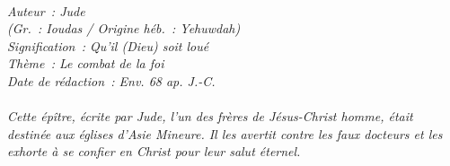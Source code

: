 \BFont
\noindent\hrulefill
{\footnotesize
\textit{
\bigskip
{\centering{}
\\Auteur~: Jude
\\(Gr.~: Ioudas / Origine héb.~: Yehuwdah)
\\Signification~: Qu'il (Dieu) soit loué
\\Thème~: Le combat de la foi
\\Date de rédaction~: Env. 68 ap. J.-C.\\}
}
\textit{
\\Cette épître, écrite par Jude, l'un des frères de Jésus-Christ homme, était destinée aux églises d'Asie Mineure. Il les avertit contre les faux docteurs et les exhorte à se confier en Christ pour leur salut éternel.\bigskip
}
}
\par\nobreak\noindent\hrulefill
